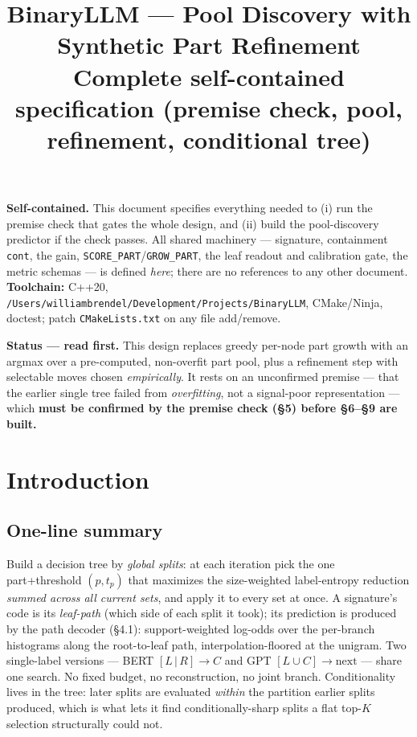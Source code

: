 \documentclass[11pt]{article}
\title{\textbf{BinaryLLM --- Pool Discovery with Synthetic Part Refinement}\\[4pt]
\large Complete self-contained specification (premise check, pool, refinement, conditional tree)}
\author{}\date{}
\newcommand{\code}[1]{\texttt{#1}}
\newcommand{\cont}{\code{cont}}
\newcommand{\score}{\code{SCORE\_PART}}
\newcommand{\grow}{\code{GROW\_PART}}
\begin{document}
\maketitle

\noindent\textbf{Self-contained.} This document specifies everything needed to (i) run the premise check that gates the whole design, and (ii) build the pool-discovery predictor if the check passes. All shared machinery --- signature, containment \cont, the gain, \score/\grow, the leaf readout and calibration gate, the metric schemas --- is defined \emph{here}; there are no references to any other document. \textbf{Toolchain:} C++20, \code{/Users/williambrendel/Development/Projects/BinaryLLM}, CMake/Ninja, doctest; patch \code{CMakeLists.txt} on any file add/remove.

\noindent\textbf{Status --- read first.} This design replaces greedy per-node part growth with an argmax over a pre-computed, non-overfit part pool, plus a refinement step with selectable moves chosen \emph{empirically}. It rests on an unconfirmed premise --- that the earlier single tree failed from \emph{overfitting}, not a signal-poor representation --- which \textbf{must be confirmed by the premise check (\S5) before \S6--\S9 are built.}

\tableofcontents
\bigskip

\section{Introduction}

\subsection{One-line summary}
Build a decision tree by \emph{global splits}: at each iteration pick the one part+threshold $(p,t_p)$ that maximizes the size-weighted label-entropy reduction \emph{summed across all current sets}, and apply it to every set at once. A signature's code is its \emph{leaf-path} (which side of each split it took); its prediction is produced by the path decoder (\S4.1): support-weighted log-odds over the per-branch histograms along the root-to-leaf path, interpolation-floored at the unigram. Two single-label versions --- BERT $[L\,|\,R]\to C$ and GPT $[L\cup C]\to\text{next}$ --- share one search. No fixed budget, no reconstruction, no joint branch. Conditionality lives in the tree: later splits are evaluated \emph{within} the partition earlier splits produced, which is what lets it find conditionally-sharp splits a flat top-$K$ selection structurally could not.
\end{document}
